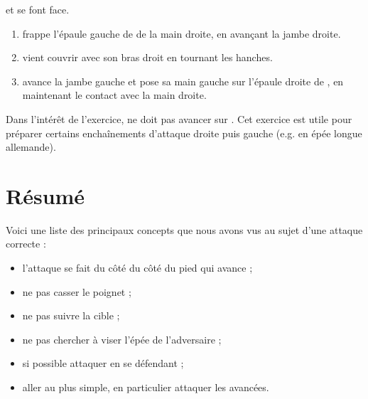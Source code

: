 \begin{exercice}
	\label{struct:ex:frappe-gauche-droite}

	

	\A et \D se font face.

	\begin{enumerate}
		\item \A frappe l'épaule gauche de \D de la main droite, en avançant la jambe droite.
		\item \D vient couvrir avec son bras droit en tournant les hanches.
		\item \A avance la jambe gauche et pose sa main gauche sur l'épaule droite de \D, en maintenant le contact avec la main droite.
	\end{enumerate}

	Dans l'intérêt de l'exercice, \D ne doit pas avancer sur \A.
	Cet exercice est utile pour préparer certains enchaînements d'attaque droite puis gauche (e.g.
	en épée longue allemande).
\end{exercice}


\section{Résumé}


\noindent
Voici une liste des principaux concepts que nous avons vus au sujet d'une attaque correcte :
\begin{itemize}
	\item l'attaque se fait du côté du côté du pied qui avance ;
	\item ne pas casser le poignet ;
	\item ne pas suivre la cible ;
	\item ne pas chercher à viser l'épée de l'adversaire ;
	\item si possible attaquer en se défendant ;
	\item aller au plus simple, en particulier attaquer les avancées.
\end{itemize}

